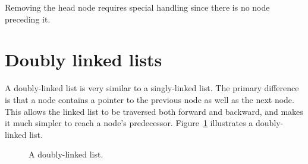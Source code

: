 \documentclass{article}
\begin{document}
  Removing the head node requires special handling since there is no node preceding it.
  \section{Doubly linked lists}
  A doubly-linked list is very similar to a singly-linked list. The primary difference is that a node contains a pointer to the previous node as well as the next node. This allows the linked list to be traversed both forward and backward, and makes it much simpler to reach a node's predecessor. Figure~\ref{fig:doublelinkedlist} illustrates a doubly-linked list.
  \begin{figure}[H]
    \centering
    \caption{A doubly-linked list.}
    \label{fig:doublelinkedlist}
  \end{figure}

%
\end{document}
